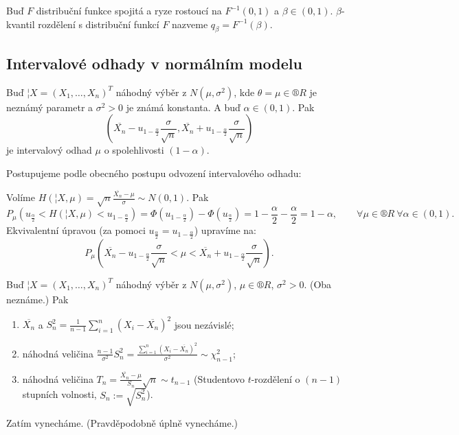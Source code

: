 \documentclass[12pt]{article}					%
\begin{document}
\begin{definice}
	Buď $F$ distribuční funkce spojitá a ryze rostoucí na $F^{-1}(0, 1)$ a $\beta \in (0, 1)$. $\beta$-kvantil rozdělení s distribuční funkcí $F$ nazveme $q_\beta = F^{-1}(\beta)$.
\end{definice}


\subsection{Intervalové odhady v normálním modelu}
\begin{veta}
	Buď $¦X = (X_1, …, X_n)^T$ náhodný výběr z $N(\mu, \sigma^2)$, kde $\theta = \mu \in ®R$ je neznámý parametr a $\sigma^2 > 0$ je známá konstanta. A buď $\alpha \in (0, 1)$. Pak
	$$ (\overline{X_n} - u_{1 - \frac{\alpha}{2}} \frac{\sigma}{\sqrt{n}}, \overline{X_n} + u_{1 - \frac{\alpha}{2}} \frac{\sigma}{\sqrt{n}}) $$
	je intervalový odhad $\mu$ o spolehlivosti $(1 - \alpha)$.

	\begin{dukazin}
		Postupujeme podle obecného postupu odvození intervalového odhadu:

		Volíme $H(¦X, \mu) = \sqrt{n} \frac{\overline{X_n} - \mu}{\sigma} \sim N(0, 1)$. Pak
		$$ P_\mu(u_{\frac{\alpha}{2}} < H(¦X, \mu) < u_{1 - \frac{\alpha}{2}}) = \Phi(u_{1 - \frac{\alpha}{2}}) - \Phi(u_{\frac{\alpha}{2}}) = 1 - \frac{\alpha}{2} - \frac{\alpha}{2} = 1 - \alpha, \qquad \forall \mu \in ®R\ \forall \alpha \in (0, 1). $$
		Ekvivalentní úpravou (za pomoci $u_{\frac{\alpha}{2}} = u_{1 - \frac{\alpha}{2}}$) upravíme na:
		$$ P_\mu(\overline{X_n} - u_{1 - \frac{\alpha}{2}} \frac{\sigma}{\sqrt{n}} < \mu < \overline{X_n} + u_{1 - \frac{\alpha}{2}} \frac{\sigma}{\sqrt{n}}). $$
	\end{dukazin}
\end{veta}

\begin{veta}
	Buď $¦X = (X_1, …, X_n)^T$ náhodný výběr z $N(\mu, \sigma^2)$, $\mu \in ®R$, $\sigma^2 > 0$. (Oba neznáme.) Pak

	\begin{enumerate}
		\item $\overline{X_n}$ a $S_n^2 = \frac{1}{n - 1} \sum_{i=1}^n (X_i - \overline{X_n})^2$ jsou nezávislé;
		\item náhodná veličina $\frac{n-1}{\sigma^2} S_n^2 = \frac{\sum_{i=1}^n (X_i - \overline{X_n})^2}{\sigma^2} \sim \chi^2_{n - 1}$;
		\item náhodná veličina $T_n = \frac{\overline{X_n} - \mu}{S_n} \sqrt{n} \sim t_{n-1}$ (Studentovo $t$-rozdělení o $(n-1)$ stupních volnosti, $S_n := \sqrt{S_n^2}$).
	\end{enumerate}

	\begin{dukazin}
		Zatím vynecháme. (Pravděpodobně úplně vynecháme.)
	\end{dukazin}
\end{veta}
\end{document}
